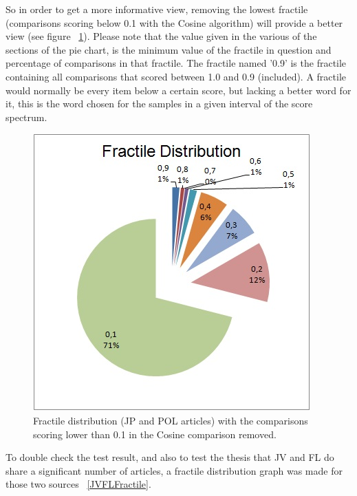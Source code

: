 So in order to get a more informative view, removing the lowest fractile (comparisons scoring below 0.1 with the Cosine algorithm) will provide a better view (see figure ~\ref{NoNoise}). Please note that the value given in the various of the sections of the pie chart, is the minimum value of the fractile in question and percentage of comparisons in that fractile. The fractile named '0.9' is the fractile containing all comparisons that scored between 1.0 and 0.9 (included). A fractile would normally be every item below a certain score, but lacking a better word for it, this is the word chosen for the samples in a given interval of the score spectrum.

\begin{figure}
	\centering
	\includegraphics[scale=1.0]{figures/FractileNoNoise}
	\caption{Fractile distribution (JP and POL articles) with the comparisons scoring lower than 0.1 in the Cosine comparison removed.}
	\label{NoNoise}
\end{figure}

To double check the test result, and also to test the thesis that JV and FL do share a significant number of articles, a fractile distribution graph was made for those two sources ~\ref{JVFLFractile}.

